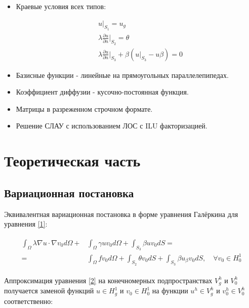 \documentclass[12pt, a4paper]{article}
\begin{document}
\begin{itemize}
\item Краевые условия всех типов:

\begin{fleqn}[20pt]
\begin{align}
  &u|_{S_1} = u_g \\[1ex]
  &\lambda \frac{\partial{u}}{\partial{n}}\bigg\rvert_{S_2} = \theta \\[1ex]
  &\lambda \frac{\partial{u}}{\partial{n}}\bigg\rvert_{S_3} + 
    \beta (u\rvert_{S_3} - u{\beta}) = 0
\end{align}
\end{fleqn}

\item Базисные функции - линейные на прямоугольных параллелепипедах.
\item Коэффициент диффузии - кусочно-постоянная функция.
\item Матрицы в разреженном строчном формате.
\item Решение СЛАУ с использованием ЛОС с ILU факторизацией.
\end{itemize}

\section{Теоретическая часть}
\subsection{Вариационная постановка}

Эквивалентная вариационная постановка в форме уравнения Галёркина
для уравнения \ref{1}:

\begin{align}
  \begin{split}\label{2}
     \int_{\Omega}\lambda\nabla{u}\cdot\nabla{v_0}d\Omega 
  + &\int_{\Omega}\gamma u v_0 d\Omega
  +  \int_{S_3}\beta u v_0 dS = \\
  = &\int_{\Omega}fv_0d\Omega + 
       \int_{S_2}\theta v_0dS + 
       \int_{S_3}\beta u_{\beta}v_0dS,
      \quad \forall v_0 \in H_0^1
  \end{split}
\end{align}

\noindent Аппроксимация уравнения \ref{2} на конечномерных подпространствах $V_g^h$ и $V_0^h$ 
получается заменой функций $u \in H_g^1$ и $v_0 \in H_0^1$ 
на функции $u^h \in V_g^h$ и $v_0^h \in V_0^h$ соответственно:
\end{document}
